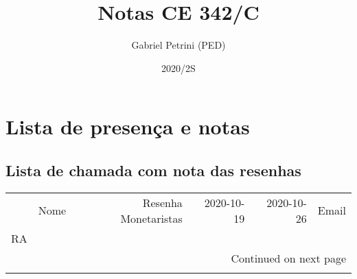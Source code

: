 \documentclass[11pt]{article}
\author{Gabriel Petrini (PED)}
\date{2020/2S}
\title{Notas CE 342/C}
\begin{document}
\maketitle

\section{Lista de presença e notas}
\label{sec:org18ec1b5}
\subsection{Lista de chamada com nota das resenhas}
\label{sec:org205a241}
\small{\begin{landscape}
\begin{longtable}{llrrrl}
\toprule
{} &                                   Nome &  Resenha Monetaristas &  2020-10-19 &  2020-10-26 &                   Email \\
RA     &                                        &                       &             &             &                         \\
\midrule
\endhead
\midrule
\multicolumn{6}{r}{{Continued on next page}} \\
\midrule
\endfoot


\end{longtable}
\end{landscape}}
\end{document}
